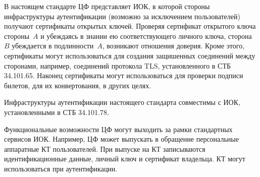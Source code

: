 В настоящем стандарте ЦФ представляет ИОК, в которой стороны инфраструктуры 
аутентификации (возможно за исключением пользователей) получают сертификаты 
открытых ключей. 
%
Проверяя сертификат открытого ключа стороны~$A$ и убеждаясь в знании ею 
соответствующего личного ключа, сторона~$B$ убеждается в подлинности~$A$,
возникают отношения доверия.
%
Кроме этого, сертификаты могут использоваться для создания защишенных 
соединений между сторонами, например, соединений протокола TLS, 
установленного в СТБ 34.101.65. 
%
Наконец сертификаты могут использоваться для проверки подписи билетов, для их 
конвертования, в других целях.  

Инфраструктуры аутентификации настоящего стандарта совместимы с ИОК, 
установленными в СТБ 34.101.78.

Функциональные возможности ЦФ могут выходить за рамки стандартных сервисов ИОК. 
Например, ЦФ может выпускать в обращение персональные аппаратные КТ 
пользователей. При выпуске на КТ записываются идентификационные данные, личный 
ключ и сертификат владельца. КТ могут использоваться при аутентификации.

